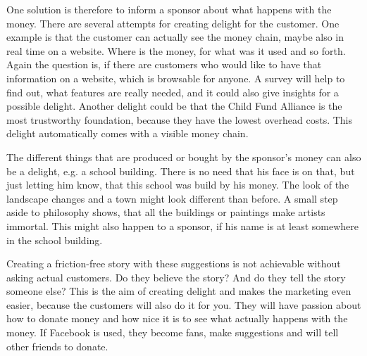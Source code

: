 One solution is therefore to inform a sponsor about what happens with the money. There are several attempts for creating delight for the customer. One example is that the customer can actually see the money chain, maybe also in real time on a website. Where is the money, for what was it used and so forth. Again the question is, if there are customers who would like to have that information on a website, which is browsable for anyone. A survey will help to find out, what features are really needed, and it could also give insights for a possible delight. Another delight could be that the Child Fund Alliance is the most trustworthy foundation, because they have the lowest overhead costs. This delight automatically comes with a visible money chain. 

The different things that are produced or bought by the sponsor's money can also be a delight, e.g. a school building. There is no need that his face is on that, but just letting him know, that this school was build by his money. The look of the landscape changes and a town might look different than before. A small step aside to philosophy shows, that all the buildings or paintings make artists immortal. This might also happen to a sponsor, if his name is at least somewhere in the school building.

Creating a friction-free story with these suggestions is not achievable without asking actual customers. Do they believe the story? And do they tell the story someone else? This is the aim of creating delight and makes the marketing even easier, because the customers will also do it for you. They will have passion about how to donate money and how nice it is to see what actually happens with the money. If Facebook is used, they become fans, make suggestions and will tell other friends to donate.